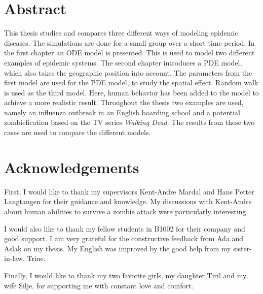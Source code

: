 \documentclass[%
twoside,                 %
final,                   %
chapterprefix=true,      %
open=right               %
10pt]{book}
\begin{document}





\newcommand{\Imax}{I_{\textrm{max}}}

\chapter*{Abstract}
This thesis studies and compares three different ways of modeling epidemic diseases. The simulations are done for a small group over a short time period. In the first chapter an ODE model is presented. This is used to model two different examples of epidemic systems. The second chapter introduces a PDE model, which also takes the geographic position into account. The parameters from the first model are used for the PDE model, to study the spatial effect. Random walk is used as the third model. Here, human behavior has been added to the model to achieve a more realistic result. Throughout the thesis two examples are used, namely an influenza outbreak in an English boarding school and a potential zombiefication based on the TV series \emph{Walking Dead}. The results from these two cases are used to compare the different models. 

\chapter*{Acknowledgements}
First, I would like to thank my supervisors Kent-Andre Mardal and Hans Petter Langtangen for their guidance and knowledge. My discussions with Kent-Andre about human abilities to survive a zombie attack were particularly interesting. 


\vspace{3mm}


I would also like to thank my fellow students in B1002 for their company and good support. I am very grateful for the constructive feedback from Ada and Aslak on my thesis. My English was improved by the good help from my sister-in-law, Trine.


\vspace{3mm}


Finally, I would like to thank my two favorite girls, my daughter Tiril and my wife Silje, for supporting me with constant love and comfort.     



\tableofcontents


\vspace{1cm} %
\end{document}

